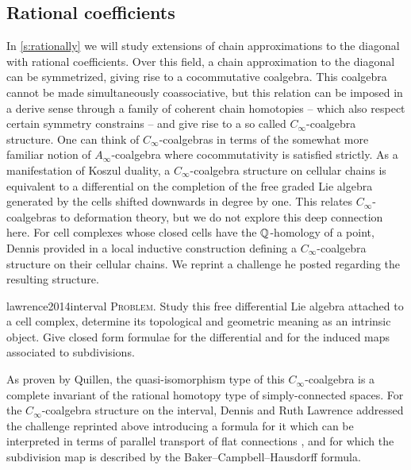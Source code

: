 \subsection*{Rational coefficients}

In \cref{s:rationally} we will study extensions of chain approximations to the diagonal with rational coefficients.
Over this field, a chain approximation to the diagonal can be symmetrized, giving rise to a cocommutative coalgebra.
This coalgebra cannot be made simultaneously coassociative, but this relation can be imposed in a derive sense through a family of coherent chain homotopies -- which also respect certain symmetry constrains -- and give rise to a so called $C_\infty$-coalgebra structure.
One can think of $C_\infty$-coalgebras in terms of the somewhat more familiar notion of $A_\infty$-coalgebra where cocommutativity is satisfied strictly.
As a manifestation of Koszul duality, a $C_\infty$-coalgebra structure on cellular chains is equivalent to a differential on the completion of the free graded Lie algebra generated by the cells shifted downwards in degree by one.
This relates $C_\infty$-coalgebras to deformation theory, but we do not explore this deep connection here.
For cell complexes whose closed cells have the $\mathbb{Q}$-homology of a point, Dennis provided in \cite{sullivan2007appendix} a local inductive construction defining a $C_\infty$-coalgebra structure on their cellular chains.
We reprint a challenge he posted regarding the resulting structure.
\begin{displaycquote}[p.2]{lawrence2014interval}
	\textsc{Problem}. Study this free differential Lie algebra attached to a cell complex, determine its topological and geometric meaning as an intrinsic object.
	Give closed form formulae for the differential and for the induced maps associated to subdivisions.
\end{displaycquote}
As proven by Quillen, the quasi-isomorphism type of this $C_\infty$-coalgebra is a complete invariant of the rational homotopy type of simply-connected spaces.
For the $C_\infty$-coalgebra structure on the interval, Dennis and Ruth Lawrence addressed the challenge reprinted above introducing a formula for it which can be interpreted in terms of parallel transport of flat connections \cite{lawrence2014interval}, and for which the subdivision map is described by the
Baker--Campbell--Hausdorff formula.

